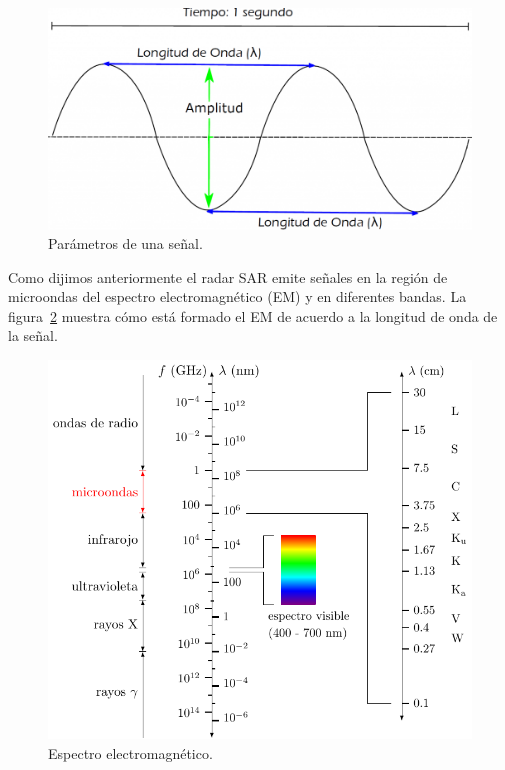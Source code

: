 \begin{figure}[H]
	\centering    
	\includegraphics[scale=0.5]{../../Figures/Tesis/Capitulo3/LongOnda.png}
	\caption{\label{LongOnda}Parámetros de una señal.}
\end{figure} 

Como dijimos anteriormente el radar SAR emite señales en la región de microondas del espectro electromagnético (EM) y en diferentes bandas. La figura~\ref{Espectro} muestra cómo está formado el EM de acuerdo a la longitud de onda de la señal.

\begin{figure}[hbt]
	\centering    
	\includegraphics[scale=1]{../../Figures/Tesis/Capitulo3/EEM.pdf}
	\caption{\label{Espectro}Espectro electromagnético.}
\end{figure}

